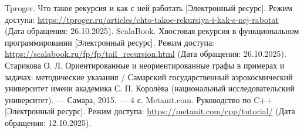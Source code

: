 \begin{thebibliography}{}
	 Tproger. Что такое рекурсия и как с ней работать [Электронный ресурс]. Режим доступа: \url{https://tproger.ru/articles/chto-takoe-rekursiya-i-kak-s-nej-rabotat} (Дата обращения: 26.10.2025).
	 ScalaBook. Хвостовая рекурсия в функциональном программировании [Электронный ресурс]. Режим доступа: \url{https://scalabook.ru/fp/fp/tail_recursion.html} (Дата обращения: 26.10.2025).
	 Старикова О. Л. Ориентированные и неориентированные графы в примерах и задачах: методические указания / Самарский государственный аэрокосмический университет имени академика С. П. Королёва (национальный исследовательский университет). --- Самара, 2015. --- 4 с.
	 Metanit.com. Руководство по C++ [Электронный ресурс]. Режим доступа: \url{https://metanit.com/cpp/tutorial/} (Дата обращения: 12.10.2025).

\end{thebibliography}

